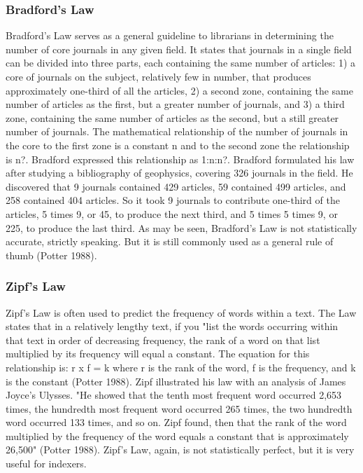 \begin{frame}
  \frametitle{Bradford's Law}

  Bradford's Law serves as a general guideline to librarians in
  determining the number of core journals in any given field. It states
  that journals in a single field can be divided into three parts, each
  containing the same number of articles: 1) a core of journals on the
  subject, relatively few in number, that produces approximately
  one-third of all the articles, 2) a second zone, containing the same
  number of articles as the first, but a greater number of journals, and
  3) a third zone, containing the same number of articles as the second,
  but a still greater number of journals. The mathematical relationship
  of the number of journals in the core to the first zone is a constant
  n and to the second zone the relationship is n?. Bradford expressed
  this relationship as 1:n:n?. Bradford formulated his law after
  studying a bibliography of geophysics, covering 326 journals in the
  field. He discovered that 9 journals contained 429 articles, 59
  contained 499 articles, and 258 contained 404 articles. So it took 9
  journals to contribute one-third of the articles, 5 times 9, or 45, to
  produce the next third, and 5 times 5 times 9, or 225, to produce the
  last third. As may be seen, Bradford's Law is not statistically
  accurate, strictly speaking. But it is still commonly used as a
  general rule of thumb (Potter 1988).

\end{frame}

\begin{frame}
  \frametitle{Zipf's Law}

  Zipf's Law is often used to predict the frequency of words within a
  text. The Law states that in a relatively lengthy text, if you "list
  the words occurring within that text in order of decreasing
  frequency, the rank of a word on that list multiplied by its
  frequency will equal a constant. The equation for this relationship
  is: r x f = k where r is the rank of the word, f is the frequency,
  and k is the constant (Potter 1988). Zipf illustrated his law with
  an analysis of James Joyce's Ulysses. "He showed that the tenth most
  frequent word occurred 2,653 times, the hundredth most frequent word
  occurred 265 times, the two hundredth word occurred 133 times, and
  so on. Zipf found, then that the rank of the word multiplied by the
  frequency of the word equals a constant that is approximately
  26,500" (Potter 1988). Zipf's Law, again, is not statistically
  perfect, but it is very useful for indexers.

\end{frame}

